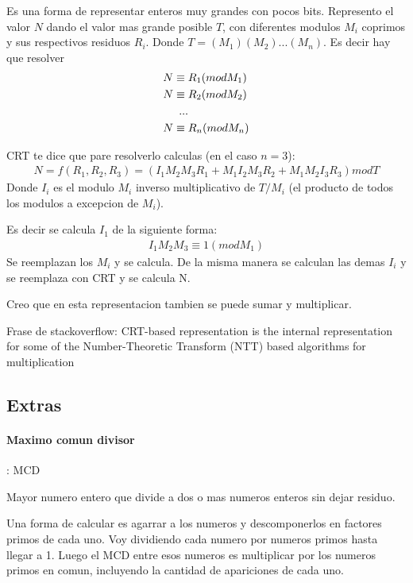 \documentclass[12pt, oneside]{article}
\begin{document}
Es una forma de representar enteros muy grandes con pocos bits.
Represento el valor $N$ dando el valor mas grande posible $T$, con diferentes modulos $M_i$
coprimos y sus respectivos residuos $R_i$.
Donde $T=(M_1)(M_2)...(M_n)$.
Es decir hay que resolver
\begin{align*}
  &N \equiv R_1 (mod M_1) \\
  & N \equiv R_2 (mod M_2) \\
  & \hspace{0.5cm}... \\
  &N \equiv R_n (mod M_n)
\end{align*}

CRT te dice que pare resolverlo calculas (en el caso $n=3$):
\begin{align*}
  N = f(R_1,R_2,R_3) =  (I_1M_2M_3R_1 + M_1I_2M_3R_2 + M_1M_2I_3R_3) mod T
\end{align*}
Donde $I_i$ es el modulo $M_i$ inverso multiplicativo de $T/M_i$ (el producto
de todos los modulos a excepcion de $M_i$).

Es decir se calcula $I_1$ de la siguiente forma:
\begin{align*}
  I_1M_2M_3 \equiv 1 (mod M_1)
\end{align*}
Se reemplazan los $M_i$ y se calcula.
De la misma manera se calculan las demas $I_i$ y se reemplaza con CRT y se calcula N.

Creo que en esta representacion tambien se puede sumar y multiplicar.


Frase de stackoverflow: CRT-based representation is the internal representation
for some of the Number-Theoretic Transform (NTT) based algorithms for multiplication
\subsection{Extras}
\paragraph{Maximo comun divisor}: MCD

Mayor numero entero que divide a dos o mas numeros enteros sin dejar residuo.

Una forma de calcular es agarrar a los numeros y descomponerlos en factores primos de cada uno.
Voy dividiendo cada numero por numeros primos hasta llegar a 1.
Luego el MCD entre esos numeros es multiplicar por los numeros primos en comun, incluyendo
la cantidad de apariciones de cada uno.

\vspace{0.3cm}
\end{document}
